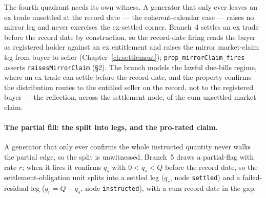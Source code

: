 \documentclass[11pt,a4paper]{article}
\begin{document}
The fourth quadrant needs its own witness. A generator that only ever leaves an ex trade
unsettled at the record date --- the coherent-calendar case --- raises no mirror leg and
never exercises the ex-settled corner. Branch~4 settles an ex trade before the record date
by construction, so the record-date firing reads the buyer as registered holder against an
ex entitlement and raises the mirror market-claim leg from buyer to seller
(Chapter~\ref{ch:settlement}); \texttt{prop\_mirrorClaim\_fires} asserts
\texttt{raisesMirrorClaim} (\S 2). The branch
models the lawful due-bills regime, where an ex trade can settle before the record date, and
the property confirms the distribution routes to the entitled seller on the record, not to
the registered buyer --- the reflection, across the settlement node, of the cum-unsettled
market claim.

\paragraph{The partial fill: the split into legs, and the pro-rated claim.} A generator that
only ever confirms the whole instructed quantity never walks the partial edge, so the split
is unwitnessed. Branch~5 draws a partial-flag with rate $r$; when it fires it confirms $q_s$
with $0 < q_s < Q$ before the record date, so the settlement-obligation unit splits into a
settled leg ($q_s$, node \texttt{settled}) and a failed-residual leg ($q_r = Q - q_s$, node
\texttt{instructed}), with a cum record date in the gap.
\end{document}
